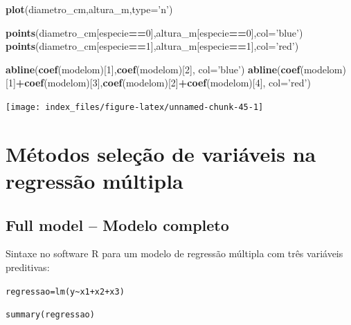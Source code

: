 \documentclass[12pt,brazil,oneside]{book}
\newenvironment{Shaded}{\begin{snugshade}}{\end{snugshade}}
\newcommand{\DataTypeTok}[1]{\textcolor[rgb]{0.13,0.29,0.53}{#1}}
\newcommand{\DecValTok}[1]{\textcolor[rgb]{0.00,0.00,0.81}{#1}}
\newcommand{\KeywordTok}[1]{\textcolor[rgb]{0.13,0.29,0.53}{\textbf{#1}}}
\newcommand{\NormalTok}[1]{#1}
\newcommand{\OperatorTok}[1]{\textcolor[rgb]{0.81,0.36,0.00}{\textbf{#1}}}
\newcommand{\StringTok}[1]{\textcolor[rgb]{0.31,0.60,0.02}{#1}}
\begin{document}
\begin{Shaded}
\begin{Highlighting}[]
\KeywordTok{plot}\NormalTok{(diametro_cm,altura_m,}\DataTypeTok{type=}\StringTok{'n'}\NormalTok{)}

\KeywordTok{points}\NormalTok{(diametro_cm[especie}\OperatorTok{==}\DecValTok{0}\NormalTok{],altura_m[especie}\OperatorTok{==}\DecValTok{0}\NormalTok{],}\DataTypeTok{col=}\StringTok{'blue'}\NormalTok{)}
\KeywordTok{points}\NormalTok{(diametro_cm[especie}\OperatorTok{==}\DecValTok{1}\NormalTok{],altura_m[especie}\OperatorTok{==}\DecValTok{1}\NormalTok{],}\DataTypeTok{col=}\StringTok{'red'}\NormalTok{)}

\KeywordTok{abline}\NormalTok{(}\KeywordTok{coef}\NormalTok{(modelom)[}\DecValTok{1}\NormalTok{],}\KeywordTok{coef}\NormalTok{(modelom)[}\DecValTok{2}\NormalTok{], }\DataTypeTok{col=}\StringTok{'blue'}\NormalTok{)}
\KeywordTok{abline}\NormalTok{(}\KeywordTok{coef}\NormalTok{(modelom)[}\DecValTok{1}\NormalTok{]}\OperatorTok{+}\KeywordTok{coef}\NormalTok{(modelom)[}\DecValTok{3}\NormalTok{],}\KeywordTok{coef}\NormalTok{(modelom)[}\DecValTok{2}\NormalTok{]}\OperatorTok{+}\KeywordTok{coef}\NormalTok{(modelom)[}\DecValTok{4}\NormalTok{], }\DataTypeTok{col=}\StringTok{'red'}\NormalTok{)}
\end{Highlighting}
\end{Shaded}

\begin{center}\texttt{[image: index\_files/figure-latex/unnamed-chunk-45-1]} \end{center}

\hypertarget{metodos-selecao-de-variaveis-na-regressao-multipla}{%
\section{Métodos seleção de variáveis na regressão múltipla}\label{metodos-selecao-de-variaveis-na-regressao-multipla}}

\hypertarget{full-model-modelo-completo}{%
\subsection{Full model -- Modelo completo}\label{full-model-modelo-completo}}

Sintaxe no software R para um modelo de regressão múltipla com três variáveis preditivas:

\texttt{regressao=lm(y\textasciitilde{}x1+x2+x3)}

\texttt{summary(regressao)}
\end{document}
